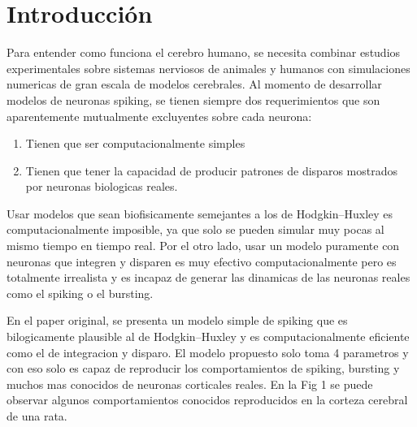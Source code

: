\documentclass[12pt]{article}
\begin{document}
\section{Introducción}
Para entender como funciona el cerebro humano, se necesita combinar estudios experimentales sobre sistemas nerviosos de animales y humanos con simulaciones numericas de gran escala de modelos cerebrales.
Al momento de desarrollar modelos de neuronas spiking, se tienen siempre dos requerimientos que son aparentemente mutualmente excluyentes sobre cada neurona:
\begin{enumerate}
    \item Tienen que ser computacionalmente simples
    \item Tienen que tener la capacidad de producir patrones de disparos mostrados por neuronas biologicas reales.
\end{enumerate}

Usar modelos que sean biofisicamente semejantes a los de Hodgkin–Huxley es computacionalmente imposible, ya que solo se pueden simular muy pocas al mismo tiempo en tiempo real. Por el otro lado, usar un modelo
puramente con neuronas que integren y disparen es muy efectivo computacionalmente pero es totalmente irrealista y es incapaz de generar las dinamicas de las neuronas reales como el spiking o el bursting.

En el paper original, se presenta un modelo simple de spiking que es bilogicamente plausible al de Hodgkin–Huxley y es computacionalmente eficiente como el de integracion y disparo.
El modelo propuesto solo toma 4 parametros y con eso solo es capaz de reproducir los comportamientos de spiking, bursting y muchos mas conocidos de neuronas corticales reales. En la Fig 1 se puede observar
algunos comportamientos conocidos reproducidos en la corteza cerebral de una rata. \\ \\

\newpage
\end{document}
